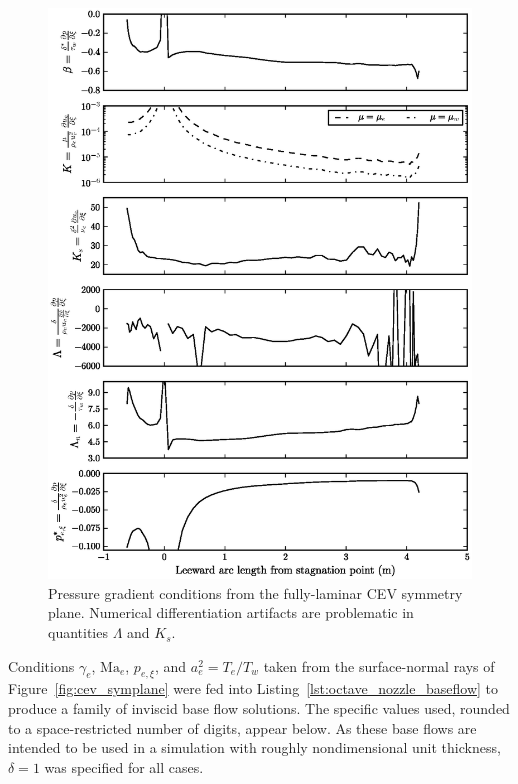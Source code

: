 \documentclass[letterpaper,11pt,nointlimits,reqno]{amsart}
\newcommand{\Mach}[1][]{\mbox{Ma}_{#1}}
\begin{document}
\begin{figure}[p]
  \centering
  \includegraphics[]{cev_summary_fpg}
  \caption{
    \label{fig:cev_summary_fpg}
    Pressure gradient conditions from the fully-laminar CEV symmetry plane.
    Numerical differentiation artifacts are problematic in quantities $\Lambda$
    and $K_s$.
  }
\end{figure}

Conditions $\gamma_e$, $\Mach[e]{}$, $p_{e,\xi}$, and $a^2_e = T_e/T_w$ taken
from the surface-normal rays of Figure~\ref{fig:cev_symplane} were fed into
Listing~\ref{lst:octave_nozzle_baseflow} to produce a family of inviscid base
flow solutions.  The specific values used, rounded to a space-restricted number
of digits, appear below.  As these base flows are intended to be used in a
simulation with roughly nondimensional unit thickness, $\delta=1$ was specified
for all cases.
\end{document}
